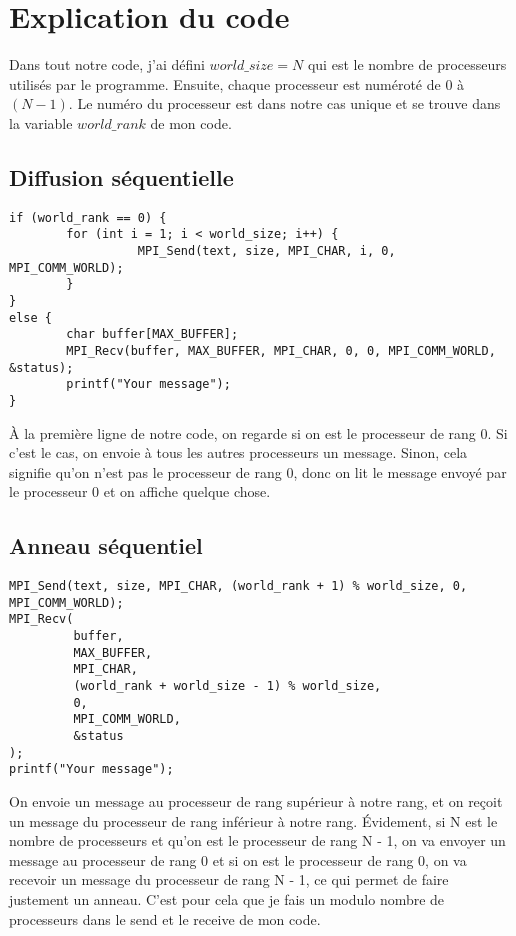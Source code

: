 \documentclass[11pt]{article}
\begin{document}
\section{Explication du code}
\label{sec:orgcd60bda}

Dans tout notre code, j'ai défini \(world\_size = N\) qui est le nombre de processeurs utilisés par le programme.
Ensuite, chaque processeur est numéroté de 0 à \((N - 1)\). Le numéro du processeur est dans notre cas unique et
se trouve dans la variable \(world\_rank\) de mon code.

\subsection{Diffusion séquentielle}
\label{sec:org89d2fe4}
\begin{verbatim}
if (world_rank == 0) {
        for (int i = 1; i < world_size; i++) {
                  MPI_Send(text, size, MPI_CHAR, i, 0, MPI_COMM_WORLD);
        }
}
else {
        char buffer[MAX_BUFFER];
        MPI_Recv(buffer, MAX_BUFFER, MPI_CHAR, 0, 0, MPI_COMM_WORLD, &status);
        printf("Your message");
}

\end{verbatim}

À la première ligne de notre code, on regarde si on est le processeur de rang 0.
Si c'est le cas, on envoie à tous les autres processeurs un message.
Sinon, cela signifie qu'on n'est pas le processeur de rang 0, donc on lit le message envoyé
par le processeur 0 et on affiche quelque chose.

\subsection{Anneau séquentiel}
\label{sec:org55b9fca}
\begin{verbatim}
MPI_Send(text, size, MPI_CHAR, (world_rank + 1) % world_size, 0, MPI_COMM_WORLD);
MPI_Recv(
         buffer,
         MAX_BUFFER,
         MPI_CHAR,
         (world_rank + world_size - 1) % world_size,
         0,
         MPI_COMM_WORLD,
         &status
);
printf("Your message");

\end{verbatim}
On envoie un message au processeur de rang supérieur à notre rang, et on reçoit un message du processeur de rang inférieur à notre rang.
Évidement, si N est le nombre de processeurs et qu'on est le processeur de rang N - 1, on va envoyer un message au processeur de rang 0 et 
si on est le processeur de rang 0, on va recevoir un message du processeur de rang N - 1, ce qui permet de faire justement un anneau.
C'est pour cela que je fais un modulo nombre de processeurs dans le send et le receive de mon code.
\end{document}
